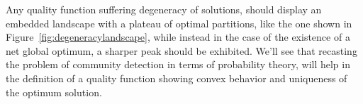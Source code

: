 Any quality function suffering degeneracy of solutions, should display an embedded landscape with a plateau of optimal partitions, like the one shown in Figure~\ref{fig:degeneracylandscape}, while instead in the case of the existence of a net global optimum, a sharper peak should be exhibited.
We'll see that recasting the problem of community detection in terms of probability theory, will help in the definition of a quality function showing convex behavior and uniqueness of the optimum solution.
